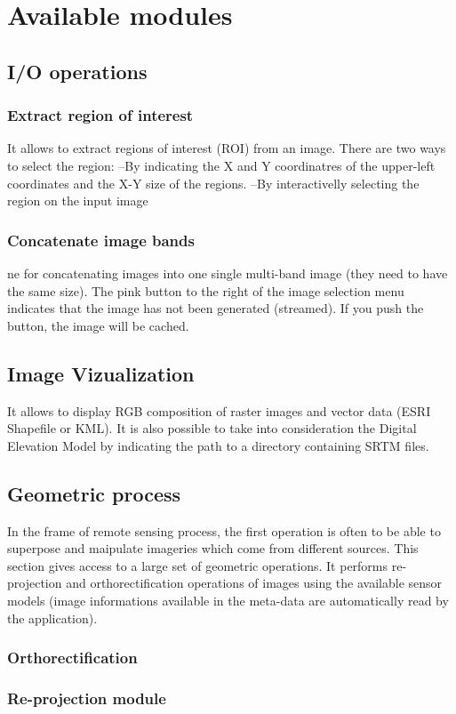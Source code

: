 \documentclass{InsightSoftwareGuide}
\begin{document}
\chapter{Available modules}
\section{I/O operations}
\subsection{Extract region of interest}
It allows to extract regions of interest (ROI) from an image. There are two ways to select the region:
--By indicating the X and Y coordinatres of the upper-left coordinates and the X-Y size of the regions.
--By interactivelly selecting the region on the input image
\subsection{Concatenate image bands}
ne for concatenating images into one single multi-band image (they need to have the same size).
The pink button to the right of the image selection menu indicates that the image has not been generated (streamed). 
If you push the button, the image will be cached. 
\section{Image Vizualization}
It allows to display RGB composition of raster images and vector data (ESRI Shapefile or KML). It is also possible to take 
into consideration the Digital Elevation Model by indicating the path to a directory containing SRTM files. 
\section{Geometric process}
In the frame of remote sensing process, the first operation is often to be able to superpose and maipulate imageries which 
come from different sources.
This section gives access to a large set of geometric operations.
It performs re-projection and orthorectification operations of images using the available sensor models 
(image informations available in the meta-data are automatically read by the application).  
\subsection{Orthorectification}
\subsection{Re-projection module}
\end{document}
